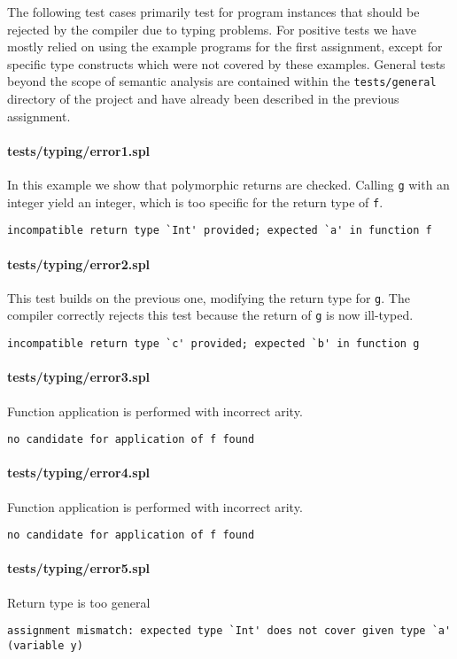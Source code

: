 \documentclass[a4paper]{article}
\begin{document}
The following test cases primarily test for program instances that should be rejected by the compiler due to typing problems.
For positive tests we have mostly relied on using the example programs for the first assignment, except for specific type constructs which were not covered by these examples.
General tests beyond the scope of semantic analysis are contained within the \verb|tests/general| directory of the project and have already been described in the previous assignment.

\paragraph{tests/typing/error1.spl}
In this example we show that polymorphic returns are checked.
Calling \verb|g| with an integer yield an integer, which is too specific for the return type of \verb|f|.
    \begin{verbatim}
incompatible return type `Int' provided; expected `a' in function f\end{verbatim}

\paragraph{tests/typing/error2.spl}
This test builds on the previous one, modifying the return type for \verb|g|.
The compiler correctly rejects this test because the return of \verb|g| is now ill-typed.
    \begin{verbatim}
incompatible return type `c' provided; expected `b' in function g\end{verbatim}

\paragraph{tests/typing/error3.spl}
Function application is performed with incorrect arity.
    \begin{verbatim}
no candidate for application of f found\end{verbatim}

\paragraph{tests/typing/error4.spl}
Function application is performed with incorrect arity.
    \begin{verbatim}
no candidate for application of f found\end{verbatim}

\paragraph{tests/typing/error5.spl}
Return type is too general
    \begin{verbatim}
assignment mismatch: expected type `Int' does not cover given type `a' (variable y)\end{verbatim}
\end{document}
